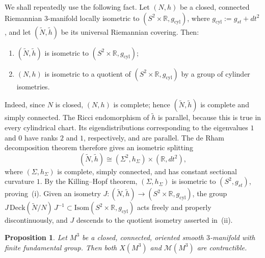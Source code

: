 \documentclass[12pt,oneside,a4paper]{article}
\newtheorem{proposition}[definition]{Proposition}
\theoremstyle{mytheorem}
\theoremstyle{remark}
\theoremstyle{definition}
\begin{document}
We shall repeatedly use the following fact. Let $(N,h)$ be a closed, connected
Riemannian $3$-manifold locally isometric to
\((S^2\times\mathbb R,g_{\mathrm{cyl}})\),
where \(g_{\mathrm{cyl}}:=g_{st}+dt^2\),
and let $(\widetilde N,\widetilde h)$ be its universal Riemannian covering.
Then:
\begin{enumerate}
\item[(i)] $(\widetilde N,\widetilde h)$ is isometric to
      $(S^2\times\mathbb R,g_{\mathrm{cyl}})$;
\item[(ii)] $(N,h)$ is isometric to a quotient of
      $(S^2\times\mathbb R,g_{\mathrm{cyl}})$ by a group of cylinder
      isometries.
\end{enumerate}
Indeed, since $N$ is closed, $(N,h)$ is complete; hence
$(\widetilde N,\widetilde h)$ is complete and simply connected. The Ricci
endomorphism of $\widetilde h$ is parallel, because this is true in every
cylindrical chart. Its eigendistributions corresponding to the eigenvalues
$1$ and $0$ have ranks $2$ and $1$, respectively, and are parallel. The de
Rham decomposition theorem therefore gives an isometric splitting
\[
(\widetilde N,\widetilde h)
\cong
(\Sigma^2,h_\Sigma)\times(\mathbb R,dt^2),
\]
where $(\Sigma,h_\Sigma)$ is complete, simply connected, and has constant
sectional curvature $1$. By the Killing--Hopf theorem,
$(\Sigma,h_\Sigma)$ is isometric to $(S^2,g_{st})$, proving~(i). Given an
isometry
\(J\colon(\widetilde N,\widetilde h)
\to (S^2\times\mathbb R,g_{\mathrm{cyl}})\),
the group
\(J\,\mathrm{Deck}(\widetilde N/N)\,J^{-1}
\subset
\mathrm{Isom}(S^2\times\mathbb R,g_{\mathrm{cyl}})\)
acts freely and properly discontinuously, and $J$ descends to the quotient
isometry asserted in~(ii).


\begin{proposition}\label{X3-contractible}
Let $M^3$ be a closed, connected, oriented smooth $3$-manifold with finite
fundamental group. Then both $X(M^3)$ and $\mathcal{M}(M^3)$ are contractible.
\end{proposition}
\end{document}
